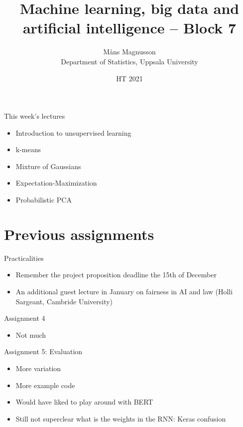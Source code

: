 \documentclass[10pt]{beamer}
\title[]{{\color{black}Machine learning, big data and artificial intelligence -- Block 7}}
\author[]{M{\aa}ns Magnusson\\Department of Statistics, Uppsala University}
\date{HT 2021}
\begin{document}
\frame{\titlepage
}



\begin{frame}{This week's lectures}
\begin{itemize}
\item Introduction to unsupervised learning
\item k-means
\item Mixture of Gaussians
\item Expectation-Maximization
\item Probabilistic PCA
\end{itemize}
\end{frame}





\section{Previous assignments}

\begin{frame}{Practicalities}

\begin{itemize}
\item Remember the project proposition deadline the 15th of December
\item An additional guest lecture in January on fairness in AI and law (Holli Sargeant, Cambride University)
\end{itemize}

\end{frame}

\begin{frame}{Assignment 4}

\begin{itemize}
\item Not much
\end{itemize}

\end{frame}

\begin{frame}{Assignment 5: Evaluation}

\begin{itemize}
\item More variation
\item More example code
\item Would have liked to play around with BERT
\item Still not superclear what is the weights in the RNN: Keras confusion
\end{itemize}

\end{frame}
\end{document}
